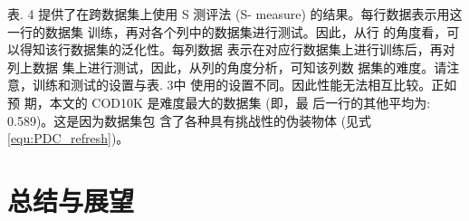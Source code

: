 \documentclass[final]{cvpr}
\renewcommand{\equref}[1]{式\ref{#1}}
\begin{document}
表. 4 提供了在跨数据集上使用 S 测评法 (S-
measure) 的结果。每行数据表示用这一行的数据集 训练，再对各个列中的数据集进行测试。因此，从行 的角度看，可以得知该行数据集的泛化性。每列数据 表示在对应行数据集上进行训练后，再对列上数据 集上进行测试，因此，从列的角度分析，可知该列数 据集的难度。请注意，训练和测试的设置与表. 3中 使用的设置不同。因此性能无法相互比较。正如预 期，本文的 COD10K 是难度最大的数据集 (即，最 后一行的其他平均为: 0.589)。这是因为数据集包 含了各种具有挑战性的伪装物体 (见\equref{equ:PDC_refresh})。


\section{总结与展望}\label{sec:Conclusion}




% 
% 

\end{document}
